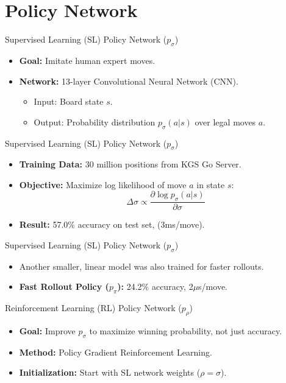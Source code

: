 \documentclass{beamer}
\begin{document}
\section{Policy Network}
\begin{frame}{Supervised Learning (SL) Policy Network ($p_{\sigma}$)}
    \begin{itemize}
        \item \textbf{Goal:} Imitate human expert moves.
        \item \textbf{Network:} 13-layer Convolutional Neural Network (CNN).
        \vspace{2ex}
        \begin{itemize}
            \item Input: Board state $s$.
            \item Output: Probability distribution $p_{\sigma}(a|s)$ over legal moves $a$.
        \end{itemize}
    \end{itemize}
\end{frame}

\begin{frame}{Supervised Learning (SL) Policy Network ($p_{\sigma}$)}
    \begin{itemize}
        \item \textbf{Training Data:} 30 million positions from KGS Go Server.
        \item \textbf{Objective:} Maximize log likelihood of move $a$ in state $s$:
        $$ \Delta\sigma \propto \frac{\partial \log p_{\sigma}(a|s)}{\partial\sigma} $$
        \item \textbf{Result:} 57.0\% accuracy on test set, (3ms/move).
    \end{itemize}
\end{frame}

\begin{frame}{Supervised Learning (SL) Policy Network ($p_{\sigma}$)}
    \begin{itemize}
        \item Another smaller, linear model was also trained for faster rollouts.
        \item \textbf{Fast Rollout Policy ($p_{\pi}$):} 24.2\% accuracy, 2$\mu$s/move.
    \end{itemize}
\end{frame}

\begin{frame}{Reinforcement Learning (RL) Policy Network ($p_{\rho}$)}
    \begin{itemize}
        \item \textbf{Goal:} Improve $p_{\sigma}$ to maximize winning probability, not just accuracy.
        \item \textbf{Method:} Policy Gradient Reinforcement Learning.
        \item \textbf{Initialization:} Start with SL network weights ($\rho = \sigma$).
    \end{itemize}
\end{frame}
\end{document}
